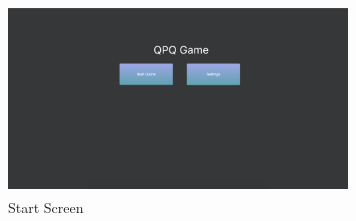\begin{figure}[!h]
\begin{center}
\includegraphics[width=9cm, height=5cm]{figures/startGame}
\end{center}
\caption{Start Screen}
\label{fig:startGame}
\end{figure}
